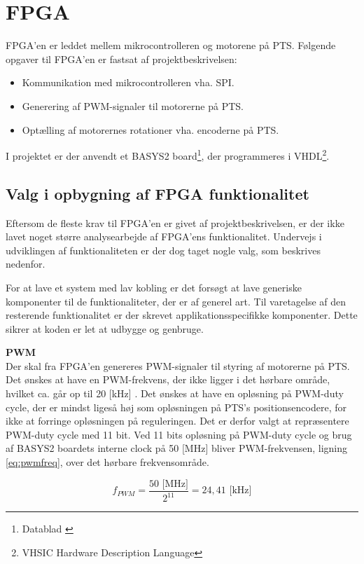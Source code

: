 \section{FPGA}
\label{sec:FPGA}
FPGA'en er leddet mellem mikrocontrolleren og motorene på PTS.
Følgende opgaver til FPGA'en er fastsat af projektbeskrivelsen:

\begin{itemize}
\itemsep1pt
	\item Kommunikation med mikrocontrolleren vha. SPI.
	\item Generering af PWM-signaler til motorerne på PTS.
	\item Optælling af motorernes rotationer vha. encoderne på PTS.
\end{itemize}
I projektet er der anvendt et BASYS2 board\footnote{Datablad \citep{basys2}}, der programmeres i VHDL\footnote{VHSIC Hardware Description Language}.

\subsection{Valg i opbygning af FPGA funktionalitet}
Eftersom de fleste krav til FPGA'en er givet af projektbeskrivelsen, er der ikke 
lavet noget større analysearbejde af FPGA'ens funktionalitet. Undervejs i 
udviklingen af funktionaliteten er der dog taget nogle valg, som beskrives nedenfor.

For at lave et system med lav kobling er det forsøgt at lave 
generiske komponenter til de funktionaliteter, der er af generel art. 
Til varetagelse af den resterende funktionalitet er der skrevet applikationsspecifikke 
komponenter.
Dette sikrer at koden er let at udbygge og genbruge.

\textbf{PWM}\\
Der skal fra FPGA'en genereres PWM-signaler til styring af motorerne på PTS.
Det ønskes at have en PWM-frekvens, der ikke ligger i det hørbare område, hvilket ca. går op til 20 [kHz] \citep{Hearingrange}. 
Det ønskes at have en opløsning på PWM-duty cycle, der er mindst ligeså høj som 
opløsningen på PTS's positionsencodere, for ikke at forringe opløsningen på reguleringen. 
Det er derfor valgt at repræsentere PWM-duty cycle med 11 bit. 
Ved 11 bits opløsning på PWM-duty cycle og brug af BASYS2 boardets interne clock på 50 [MHz] bliver PWM-frekvensen,
ligning \ref{eq:pwmfreq}, over det hørbare frekvensområde.

\begin{equation}
  f_{PWM}=\frac{50 \text{ [MHz]}}{2^{11}} = 24,41 \text{ [kHz]}
	\label{eq:pwmfreq}
\end{equation}

